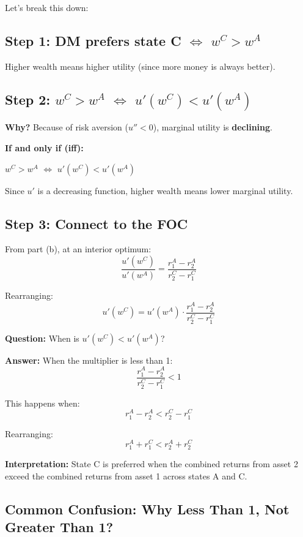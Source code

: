 \documentclass[12pt]{article}
\begin{document}
Let's break this down:

\subsection*{Step 1: DM prefers state C $\Leftrightarrow$ $w^C > w^A$}

Higher wealth means higher utility (since more money is always better).

\subsection*{Step 2: $w^C > w^A$ $\Leftrightarrow$ $u'(w^C) < u'(w^A)$}

\textbf{Why?} Because of risk aversion ($u'' < 0$), marginal utility is \textbf{declining}.

\begin{center}
\colorbox{yellow!30}{
\begin{minipage}{0.9\textwidth}
\textbf{If and only if (iff):}

$w^C > w^A$ \quad $\Leftrightarrow$ \quad $u'(w^C) < u'(w^A)$

Since $u'$ is a decreasing function, higher wealth means lower marginal utility.
\end{minipage}
}
\end{center}

\subsection*{Step 3: Connect to the FOC}

From part (b), at an interior optimum:
$$\frac{u'(w^C)}{u'(w^A)} = \frac{r_1^A - r_2^A}{r_2^C - r_1^C}$$

Rearranging:
$$u'(w^C) = u'(w^A) \cdot \frac{r_1^A - r_2^A}{r_2^C - r_1^C}$$

\textbf{Question:} When is $u'(w^C) < u'(w^A)$?

\textbf{Answer:} When the multiplier is less than 1:
$$\frac{r_1^A - r_2^A}{r_2^C - r_1^C} < 1$$

This happens when:
$$r_1^A - r_2^A < r_2^C - r_1^C$$

Rearranging:
$$r_1^A + r_1^C < r_2^A + r_2^C$$

\textbf{Interpretation:} State C is preferred when the combined returns from asset 2 exceed the combined returns from asset 1 across states A and C.

\subsection*{Common Confusion: Why Less Than 1, Not Greater Than 1?}
\end{document}
